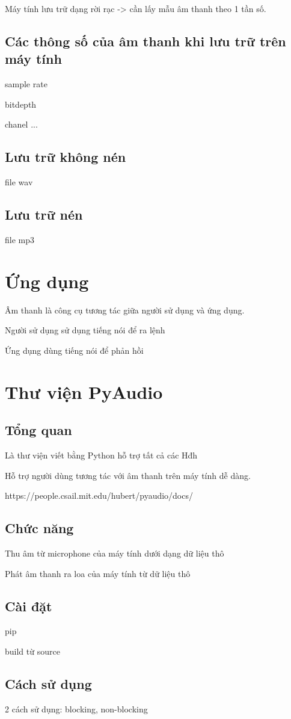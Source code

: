 Máy tính lưu trữ dạng rời rạc -> cần lấy mẫu âm thanh theo 1 tần số.
\subsection{Các thông số của âm thanh khi lưu trữ trên máy tính}
sample rate

bitdepth

chanel
...
\subsection{Lưu trữ không nén}
file wav
\subsection{Lưu trữ nén}
file mp3

\section{Ứng dụng}
Âm thanh là công cụ tương tác giữa người sử dụng và ứng dụng.

Người sử dụng sử dụng tiếng nói để ra lệnh

Ứng dụng dùng tiếng nói để phản hồi

\section{Thư viện PyAudio}
\subsection{Tổng quan}
Là thư viện viết bằng Python hỗ trợ tất cả các Hđh

Hỗ trợ người dùng tương tác với âm thanh trên máy tính dễ dàng.

https://people.csail.mit.edu/hubert/pyaudio/docs/
\subsection{Chức năng}
Thu âm từ microphone của máy tính dưới dạng dữ liệu thô

Phát âm thanh ra loa của máy tính từ dữ liệu thô
\subsection{Cài đặt}
pip

build từ source
\subsection{Cách sử dụng}
2 cách sử dụng: blocking, non-blocking

